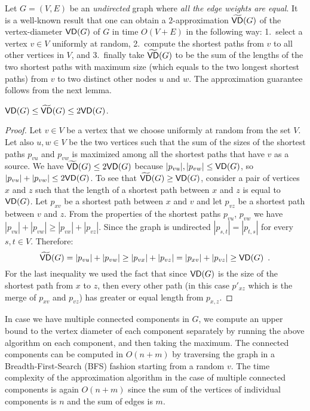 Let $G=(V,E)$ be an \emph{undirected} graph where \emph{all the edge weights are
equal}.
It is a well-known result that one can obtain a $2$-approximation
$\widetilde{\mathsf{VD}}(G)$ of the vertex-diameter $\mathsf{VD}(G)$ of $G$ in time $O(V+E)$ in
the following way: 1.~select a vertex $v\in V$ uniformly at random, 2.~compute
the shortest paths from $v$ to all other vertices in $V$, and 3.~finally take
$\widetilde{\mathsf{VD}}(G)$ to be the sum of the lengths of the two shortest paths with
maximum size (which equals to the two longest shortest paths) from $v$ to two
distinct other nodes $u$ and $w$. 
\ifproof
The approximation guarantee follows from the next lemma.

\begin{lemma}\label{lem:diam}
  $\mathsf{VD}(G)\le\widetilde{\mathsf{VD}}(G)\le 2\mathsf{VD}(G)$.
\end{lemma}
\begin{proof}
  Let $v\in V$ be a vertex that we choose uniformly at random from the set $V$.
  Let also $u,w\in V$ be the two vertices such that the sum of the sizes of the
  shortest paths $p_{vu}$ and $p_{vw}$ is maximized among all the shortest paths
  that have $v$ as a source.  We have $\widetilde{\mathsf{VD}}(G)\le 2\mathsf{VD}(G)$ because
  $|p_{vu}|,|p_{vw}|\le\mathsf{VD}(G)$, so $|p_{vu}|+|p_{vw}|\le 2\mathsf{VD}(G)$. To see
  that $\widetilde{\mathsf{VD}}(G)\ge\mathsf{VD}(G)$, consider a pair of vertices $x$ and $z$ such
  that the length of a shortest path between $x$ and $z$ is equal to $\mathsf{VD}(G)$.
  Let $p_{xv}$ be a shortest path between $x$ and $v$ and let $p_{vz}$ be a
  shortest path between $v$ and $z$. 
  From the properties of the shortest paths $p_{vu}$, $p_{vw}$ we have
  $|p_{vu}|+|p_{vw}|\geq |p_{vx}|+|p_{vz}|$. Since the graph is undirected
  $|p_{s,t}|=|p_{t,s}|$ for every $s,t\in V$.
  Therefore:
  \[
    \widetilde{\mathsf{VD}}(G) = |p_{vu}|+|p_{vw}|\geq |p_{vx}|+|p_{vz}| =
    |p_{xv}|+|p_{vz}|\ge\mathsf{VD}(G)\enspace. 
  \]
  For the last inequality we used the fact that since $\mathsf{VD}(G)$ is the size of
  the shortest path from $x$ to $z$, then every other path (in this case
  $p'_{xz}$ which is the merge of $p_{xv}$ and $p_{vz}$) has greater or equal
  length from $p_{x,z}$.
\end{proof}
\fi
In case we have multiple connected components in $G$, we compute an upper bound
to the vertex diameter of each component separately by running the above
algorithm on each component, and then taking the maximum. 
The connected components can be computed in $O(n+m)$ by traversing the graph in
a Breadth-First-Search (BFS) fashion starting from a random $v$.
The time complexity of the approximation algorithm in the case of multiple
connected components is again $O(n+m)$ since the sum of the vertices of
individual components is $n$ and the sum of edges is $m$. 

